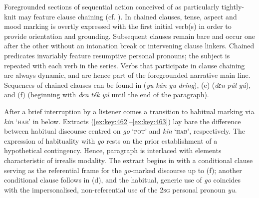 \z
\z

Foregrounded sections of sequential action conceived of as particularly tightly-knit may feature clause chaining (cf. ). In chained clauses, tense, aspect and mood marking is overtly expressed with the first initial verb(s) in order to provide orientation and grounding. Subsequent clauses remain bare and occur one after the other without an intonation break or intervening clause linkers. Chained predicates invariably feature resumptive personal pronouns; the subject is repeated with each verb in the series. Verbs that participate in clause chaining are always dynamic, and are hence part of the foregrounded narrative main line. Sequences of chained clauses can be found in  (\textit{yu} \textit{kán} \textit{yu} \textit{dríng}), (e) (\textit{dɛn} \textit{púl} \textit{yú}), and (f) (beginning with \textit{dɛn} \textit{ték} \textit{yú} until the end of the paragraph).


After a brief interruption by a listener comes a transition to habitual marking via \textit{kin} ‘\textsc{hab}’ in  below. Extracts (\ref{ex:key:462}–\ref{ex:key:463}) lay bare the difference between habitual discourse centred on \textit{go} ‘\textsc{pot}’ and \textit{kin} ‘\textsc{hab}’, respectively. The expression of habituality with \textit{go} rests on the prior establishment of a hypothetical contingency. Hence, paragraph  is interlaced with elements characteristic of irrealis modality. The extract begins in  with a conditional clause serving as the referential frame for the \textit{go}{}-marked discourse up to (f); another conditional clause follows in (d), and the habitual, generic use of \textit{go} coincides with the impersonalised, non-referential use of the \textsc{2sg} personal pronoun \textit{yu}.




